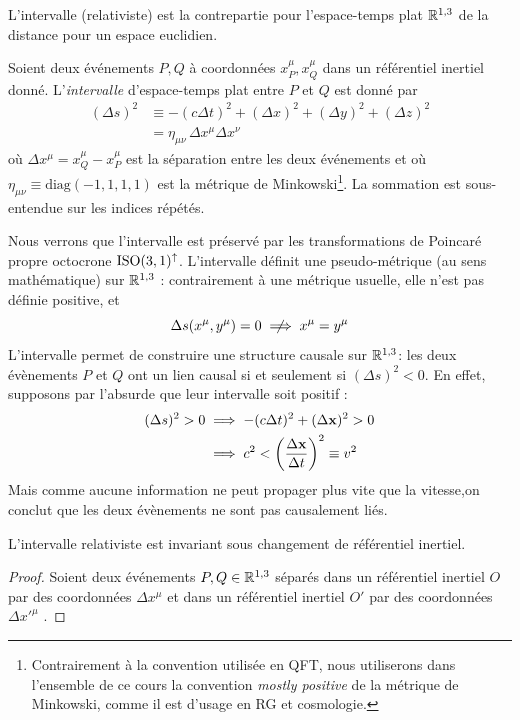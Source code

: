 {L'intervalle (relativiste) est la contrepartie pour l'espace-temps plat $\mathbb{R}^{1,3}$ de la distance pour un espace euclidien.

\begin{theoremframe}
    \begin{defi}
        Soient deux événements $P,Q$ à coordonnées $x_P^\mu, x_Q^\mu$ dans un référentiel inertiel donné. L'\emph{intervalle} d'espace-temps plat entre $P$ et $Q$ est donné par
        \begin{align}
            (\Delta s)^2 &\equiv -(c\Delta t)^2 + (\Delta x)^2 + (\Delta y)^2 + (\Delta z)^2\\
            &= \eta _{\mu \nu} \, \Delta x^{\mu} \Delta x^{\nu}
        \end{align}
        où $\Delta x^{\mu}=x^\mu_Q-x^\mu_P$ est la séparation entre les deux événements et où $\eta _{\mu \nu} \equiv \textrm{diag}(-1, 1, 1, 1)$ est la métrique de Minkowski\footnote{Contrairement à la convention utilisée en QFT, nous utiliserons dans l'ensemble de ce cours la convention \emph{mostly positive} de la métrique de Minkowski, comme il est d'usage en RG et cosmologie.}. La sommation est sous-entendue sur les indices répétés.
    \end{defi}
\end{theoremframe}
Nous verrons que l'intervalle est préservé par les transformations de Poincaré propre octocrone $\operatorname{ISO} (3,1)^\uparrow$. L'intervalle définit une pseudo-métrique (au sens mathématique) sur $\mathbb{R}^{1,3}$ : contrairement à une métrique usuelle, elle n'est pas définie positive, et 
\begin{equation}
    \Delta s(x^\mu,y^\mu)=0 \centernot \implies x^\mu=y^\mu
\end{equation}
L'intervalle permet de construire une structure causale sur $\mathbb{R}^{1,3}$: les deux évènements $P$ et $Q$ ont un lien causal si et seulement si $(\Delta s)^2 < 0$. En effet, supposons par l'absurde que leur intervalle soit positif :
\begin{align}
    (\Delta s)^2 > 0 &\implies -(c\Delta t)^2 + (\Delta \bm{\mathrm{x}})^2 > 0\\
    &\implies c^2 < \left( \frac{\Delta \bm{\mathrm{x}}}{\Delta t} \right)^2 \equiv v^2
\end{align}
Mais comme aucune information ne peut propager plus vite que la vitesse,on conclut que les deux évènements ne sont pas causalement liés. 

\begin{theoremframe}
    \begin{propri}
        L'intervalle relativiste est invariant sous changement de référentiel inertiel.
    \end{propri}
\end{theoremframe}
\begin{proof}
    Soient deux événements $P,Q \in \mathbb{R}^{1,3}$ séparés dans un référentiel inertiel $O$ par des coordonnées $\Delta x^{\mu}$ et dans un référentiel inertiel $O'$ par des coordonnées $\Delta x'^{\mu}$ .


\end{proof}}
